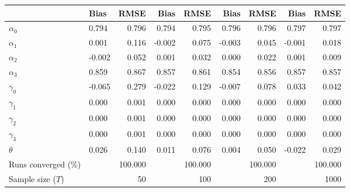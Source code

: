 
\begin{tabular}[t]{llrrrrrrr}
\toprule
  & Bias & RMSE & Bias & RMSE & Bias & RMSE & Bias & RMSE\\
\midrule
$\alpha_{0}$ & 0.794 & 0.796 & 0.794 & 0.795 & 0.796 & 0.796 & 0.797 & 0.797\\
$\alpha_{1}$ & 0.001 & 0.116 & -0.002 & 0.075 & -0.003 & 0.045 & -0.001 & 0.018\\
$\alpha_{2}$ & -0.002 & 0.052 & 0.001 & 0.032 & 0.000 & 0.022 & 0.001 & 0.009\\
$\alpha_{3}$ & 0.859 & 0.867 & 0.857 & 0.861 & 0.854 & 0.856 & 0.857 & 0.857\\
$\gamma_{0}$ & -0.065 & 0.279 & -0.022 & 0.129 & -0.007 & 0.078 & 0.033 & 0.042\\
$\gamma_{1}$ & 0.000 & 0.001 & 0.000 & 0.000 & 0.000 & 0.000 & 0.000 & 0.000\\
$\gamma_{2}$ & 0.000 & 0.001 & 0.000 & 0.000 & 0.000 & 0.000 & 0.000 & 0.000\\
$\gamma_{3}$ & 0.000 & 0.001 & 0.000 & 0.000 & 0.000 & 0.000 & 0.000 & 0.000\\
$\theta$ & 0.026 & 0.140 & 0.011 & 0.076 & 0.004 & 0.050 & -0.022 & 0.029\\
Runs converged (\%) &  & 100.000 &  & 100.000 &  & 100.000 &  & 100.000\\
Sample size ($T$) &  & 50 &  & 100 &  & 200 &  & 1000\\
\bottomrule
\end{tabular}
